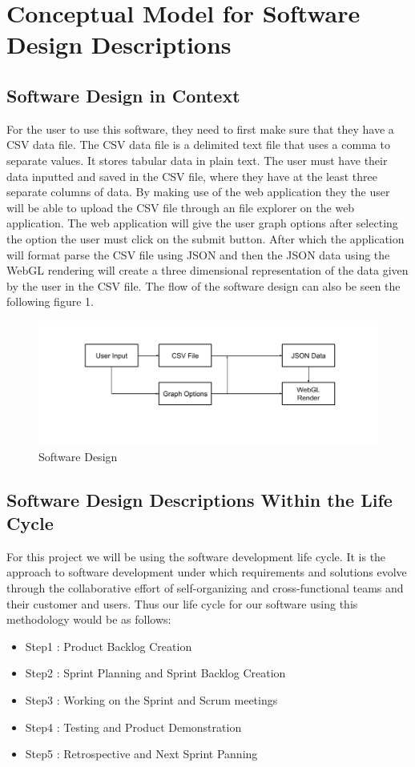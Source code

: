 \documentclass[journal,10pt,onecolumn,compsoc]{IEEEtran} \usepackage[margin=1.0in]{geometry} \usepackage{pdfpages}
\begin{document}
\section{Conceptual Model for Software Design Descriptions}
    \subsection{Software Design in Context}
    For the user to use this software, they need to first make sure that they have a CSV data file. The CSV data file is a delimited text file that uses a comma to separate values. It stores tabular data in plain text. The user must have their data inputted and saved in the CSV file, where they have at the least three separate columns of data. By making use of the web application they the user will be able to upload the CSV file through an file explorer on the web application. The web application will give the user graph options after selecting the option the user must click on the submit button. After which the application will format parse the CSV file using JSON and then the JSON data using the WebGL rendering will create a three dimensional representation of the data given by the user in the CSV file. The flow of the software design can also be seen the following figure 1.
    \begin{figure}[H]
        \centering
         \includegraphics[width=\linewidth]{designDocFlowchartEdit.png}
         \caption{Software Design}
        \label{fig:my_label}
    \end{figure}
    \subsection{Software Design Descriptions Within the Life Cycle}
    For this project we will be using the software development life cycle. It is the approach to software development under which requirements and solutions evolve through the collaborative effort of self-organizing and cross-functional teams and their customer and users. Thus our life cycle for our software using this methodology would be as follows:
    \begin{itemize}
    \item Step1 : Product Backlog Creation
    \item Step2 : Sprint Planning and Sprint Backlog Creation 
    \item Step3 : Working on the Sprint and Scrum meetings
    \item Step4 : Testing and Product Demonstration
    \item Step5 : Retrospective and Next Sprint Panning
    \end{itemize}
\end{document}
